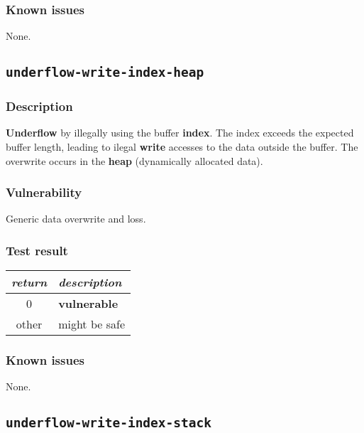 \documentclass[a4paper]{book}
\begin{document}
\subsubsection{Known issues}

None.

\newpage

\subsection{\texttt{underflow-write-index-heap}}\label{test-underflow-write-index-heap}

\subsubsection{Description}

\textbf{Underflow} by illegally using the buffer \textbf{index}.
The index exceeds the expected buffer length,
leading to ilegal \textbf{write} accesses to the data outside the buffer.
The overwrite occurs in the \textbf{heap} (dynamically allocated data).

\subsubsection{Vulnerability}
Generic data overwrite and loss.

\subsubsection{Test result}
\begin{tabular}{cl}
  \toprule
  \emph{return}  & \emph{description} \\
  \midrule
  0              & \textbf{vulnerable} \\
  other          & might be safe \\
  \bottomrule
\end{tabular}

\subsubsection{Known issues}

None.

\newpage

\subsection{\texttt{underflow-write-index-stack}}\label{test-underflow-write-index-stack}
\end{document}
